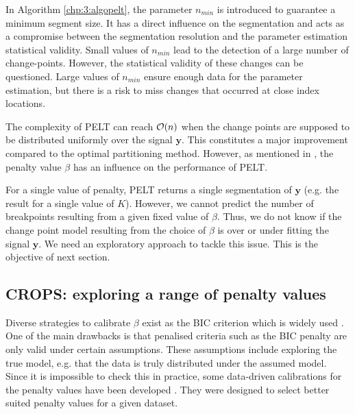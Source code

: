 In Algorithm \ref{chp:3:algopelt}, the parameter $n_{min}$ is introduced to guarantee a minimum segment size. It has a direct influence on the segmentation and acts as a compromise between the segmentation resolution and the parameter estimation statistical validity. Small values of $n_{min}$ lead to the detection of a large number of change-points. However, the statistical validity of these changes can be questioned. Large values of $n_{min}$ ensure enough data for the parameter estimation, but there is a risk to miss changes that occurred at close index locations.  
  
The complexity of PELT can reach ${\mathcal O}(n)$ when the change points are supposed to be distributed uniformly over the signal $\bm y$. This constitutes a major improvement compared to the optimal partitioning method. However, as mentioned in \cite{Haynes2016}, the penalty value $\beta$ has an influence on the performance of PELT. 

For a single value of penalty, PELT returns a single segmentation of $\bm y$ (e.g. the result for a single value of $K$). However, we cannot predict the number of breakpoints resulting from a given fixed value of $\beta$. Thus, we do not know if the change point model resulting from the choice of $\beta$ is over or under fitting the signal $\bm y$. We need an exploratory approach to tackle this issue. This is the objective of next section.
   

\subsection{CROPS: exploring a range of penalty values}\label{chp:3:4:2}

Diverse strategies to calibrate $\beta$ exist as the BIC criterion which is widely used \citep{YAO1988181,faure2016comparison,Shi2022}. 
One of the main drawbacks is that penalised criteria such as the BIC penalty are only valid under certain assumptions. These assumptions include exploring the true model, e.g. that the data is truly distributed under the assumed model. Since it is impossible to check this in practice, some data-driven calibrations for the penalty values have been developed \citep{Birge2006,Baudry2011,Bardet2012,arlot2009data}. They were designed to select better suited penalty values for a given dataset.  

